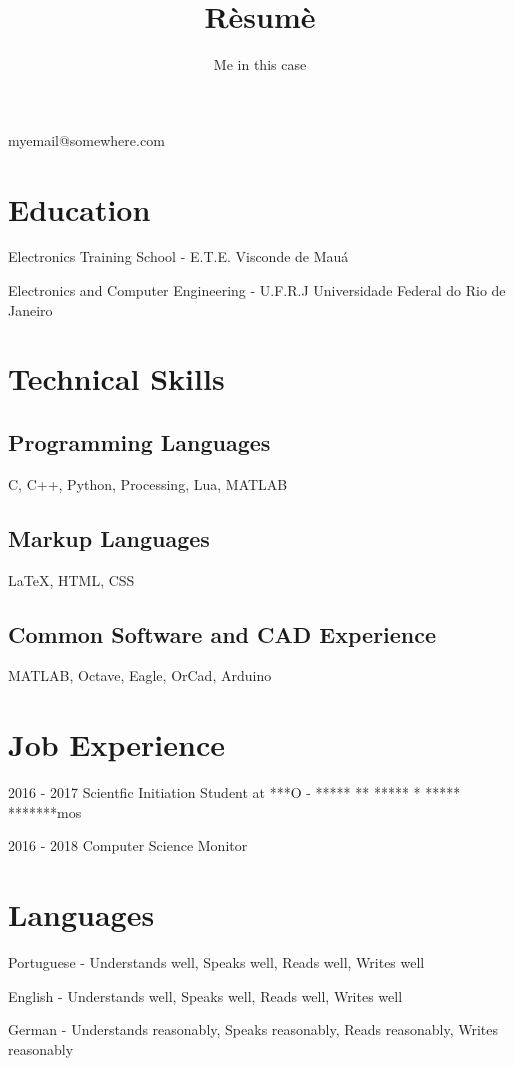 \documentclass {article}
\makeatletter
\renewcommand {\maketitle}
{
	\begin {center}
	{
		\huge\bfseries
		\theauthor
	}

	\vspace {.25em}
	myemail@somewhere.com

	\end {center}
}
\makeatother
\begin{document}
\title {R\`esum\`e}
\author {Me in this case}

\maketitle {}

\section {Education}

Electronics Training School - E.T.E. Visconde de Mauá


Electronics and Computer Engineering - U.F.R.J Universidade Federal do Rio de Janeiro

\section {Technical Skills}

\subsection {Programming Languages}

C, C++, Python, Processing, Lua, MATLAB

\subsection {Markup Languages}

{\LaTeX}, HTML, CSS

\subsection {Common Software and CAD Experience}

MATLAB, Octave, Eagle, OrCad, Arduino

\section {Job Experience}

2016 - 2017
Scientfic Initiation Student at ***O - ***** ** ***** * ***** *******mos


2016 - 2018
Computer Science Monitor




\section {Languages}

Portuguese - Understands well, Speaks well, Reads well, Writes well


English - Understands well, Speaks well, Reads well, Writes well


German - Understands reasonably, Speaks reasonably, Reads reasonably, Writes reasonably 
\end{document}
